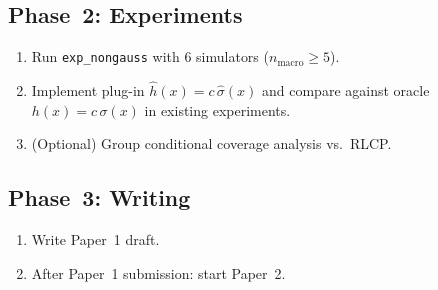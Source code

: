 \documentclass[11pt]{article}
\begin{document}
\subsection{Phase~2: Experiments}

\begin{enumerate}
  \item Run \texttt{exp\_nongauss} with 6 simulators
    ($n_{\mathrm{macro}} \ge 5$).
  \item Implement plug-in $\hat h(x) = c\,\hat\sigma(x)$ and compare
    against oracle $h(x) = c\,\sigma(x)$ in existing experiments.
  \item (Optional) Group conditional coverage analysis vs.\ RLCP.
\end{enumerate}

\subsection{Phase~3: Writing}

\begin{enumerate}
  \item Write Paper~1 draft.
  \item After Paper~1 submission: start Paper~2.
\end{enumerate}
\end{document}
